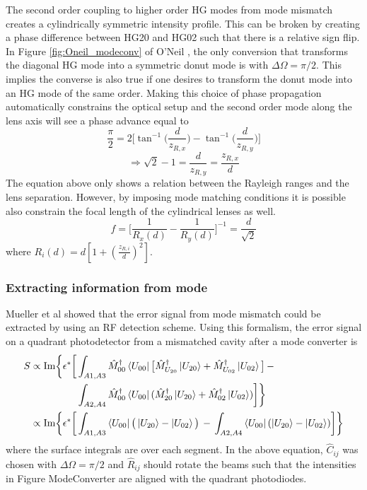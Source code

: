The second order coupling to higher order HG modes from mode mismatch creates a cylindrically symmetric intensity profile.  This can be broken by creating a phase difference between HG20 and HG02 such that there is a relative sign flip.  In Figure \ref{fig:Oneil_modeconv} of O'Neil \cite{ONeilModeTransform}, the only conversion that transforms the diagonal HG mode into a symmetric donut mode is with $\Delta \Omega = \pi/2$. This implies the converse is also true if one desires to transform the donut mode into an HG mode of the same order. Making this choice of phase propagation automatically constrains the optical setup and the second order mode along the lens axis will see a phase advance equal to
	\begin{equation}
	\frac{\pi}{2} = 2\bigg[\tan^{-1}\bigg(\frac{d}{z_{R,x}}\bigg) - \tan^{-1} \bigg(\frac{d}{z_{R,y}} \bigg)  \bigg]
	\end{equation} 
	\begin{equation}
	  \Rightarrow \sqrt{2} - 1 = \frac{d}{z_{R,y}} = \frac{z_{R,x}}{d}
	\end{equation}
The equation above only shows a relation between the Rayleigh ranges and the lens separation. However, by imposing mode matching conditions it is possible also constrain the focal length of the cylindrical lenses as well.
	\begin{equation}
	f = \bigg[\frac{1}{R_x(d)} - \frac{1}{R_y(d)}\bigg]^{-1} = \frac{d}{\sqrt{2}}
	\end{equation}
	where $R_i(d) = d [ 1 + (\frac{z_{R,i}}{d})^2]$.

\subsubsection{Extracting information from mode}
Mueller et al \cite{MuellerMM} showed that the error signal from mode mismatch could be extracted by using an RF detection scheme. Using this formalism, the error signal on a quadrant photodetector from a mismatched cavity after a mode converter is 
	\begin{equation}
	\begin{aligned}
	S 	\propto  \text{Im} \bigg\{ \epsilon^{*} \bigg[&\int_{A1,A3} \hat{M}^{\dagger}_{00} \bra{U_{00}} \big[\hat{M}^{\dagger}_{U_{20}} \ket{U_{20}} + \hat{M}^{\dagger}_{U_{02}} \ket{U_{02}}\big]  \, -\\
	 \, &\int_{A2,A4} \hat{M}^{\dagger}_{00} \bra{U_{00}} (\hat{M}^{\dagger}_{20} \ket{U_{20}} + \hat{M}^{\dagger}_{02} \ket{U_{02}}) \bigg] \bigg\}\\
	\propto \text{Im} \bigg\{ \epsilon^{*} \bigg[&\int_{A1,A3} \bra{U_{00}} \big(\ket{U_{20}} - \ket{U_{02}}\big)  \,-\, \int_{A2,A4}  \bra{U_{00}} ( \ket{U_{20}} - \ket{U_{02}}) \bigg] \bigg\}
	\end{aligned}
	\end{equation}
where the surface integrals are over each segment.  In the above equation, $\hat{C}_{ij} $ was chosen with $\Delta \Omega = \pi/2$ and $\hat{R}_{ij}$ should rotate the beams such that the intensities in Figure {ModeConverter} are aligned with the quadrant photodiodes.
		
